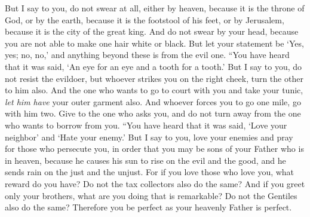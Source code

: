 \begin{biblechapter}
\verse But I say to you, do not swear at all, either by heaven, because it is the throne of God,
\verse or by the earth, because it is the footstool of his feet, or by Jerusalem, because it is the city of the great king.
\verse And do not swear by your head, because you are not able to make one hair white or black.
\verse But let your statement be ‘Yes, yes; no, no,’ and anything beyond these is from the evil one.
 “You have heard that it was said, ‘An eye for an eye and a tooth for a tooth.’
\verse But I say to you, do not resist the evildoer, but whoever strikes you on the right cheek, turn the other to him also.
\verse And the one who wants to go to court with you and take your tunic, \textit{let him have} your outer garment also.
\verse And whoever forces you to go one mile, go with him two.
\verse Give to the one who asks you, and do not turn away from the one who wants to borrow from you.
 “You have heard that it was said, ‘Love your neighbor’ and ‘Hate your enemy.’
\verse But I say to you, love your enemies and pray for those who persecute you,
\verse in order that you may be sons of your Father who is in heaven, because he causes his sun to rise on the evil and the good, and he sends rain on the just and the unjust.
\verse For if you love those who love you, what reward do you have? Do not the tax collectors also do the same?
\verse And if you greet only your brothers, what are you doing that is remarkable? Do not the Gentiles also do the same?
\verse Therefore you be perfect as your heavenly Father is perfect.
\end{biblechapter}

